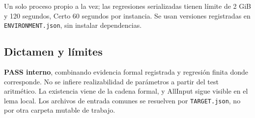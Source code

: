 Un solo proceso propio a la vez; las regresiones serializadas tienen
límite de 2 GiB y 120 segundos, Certo 60 segundos por instancia. Se usan
versiones registradas en \texttt{ENVIRONMENT.json}, sin instalar
dependencias.

\subsection{Dictamen y límites}\label{dictamen-y-luxedmites}

\textbf{PASS interno}, combinando evidencia formal registrada y
regresión finita donde corresponde. No se infiere realizabilidad de
parámetros a partir del test aritmético. La existencia viene de la
cadena formal, y AllInput sigue visible en el lema local. Los archivos
de entrada comunes se resuelven por \texttt{TARGET.json}, no por otra
carpeta mutable de trabajo.

